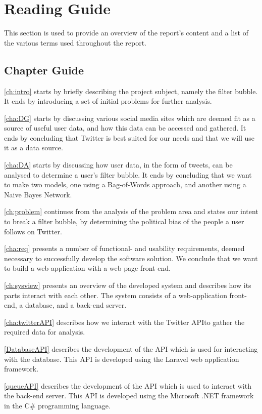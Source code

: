 \section{Reading Guide}\label{sec:readingGuide}
This section is used to provide an overview of the report's content and a list
of the various terms used throughout the report.

\subsection{Chapter Guide}
\autoref{ch:intro} starts by briefly describing the project subject, namely  the
filter bubble. It ends by introducing a set of initial problems for further
analysis.\nl

\autoref{cha:DG} starts by discussing various social media sites which are
deemed fit as a source of useful user data, and how this data can be
accessed and gathered. It ends by concluding that Twitter is best suited for our
needs and that we will use it as a data source.\nl

\autoref{cha:DA} starts by discussing how user data, in the form of tweets, can
be analysed to determine a user's filter bubble. It ends by concluding
that we want to make two models, one using a Bag-of-Words approach, and another
using a Naive Bayes Network.\nl

\autoref{ch:problem} continues from the analysis of the problem area and states
our intent to break a filter bubble, by determining the political bias of the
people a user follows on Twitter.\nl

\autoref{cha:req} presents a number of functional- and usability requirements,
deemed necessary to successfully develop the software solution. We conclude that
we want to build a web-application with a web page front-end.\nl

\autoref{ch:sysview} presents an overview of the developed system and describes
how its parts interact with each other. The system consists of a web-application
front-end, a database, and a back-end server.\nl

\autoref{cha:twitterAPI} describes how we interact with the Twitter \ac{API}to
gather the required data for analysis.\nl

\autoref{DatabaseAPI} describes the development of the \ac{API} which is used
for interacting with the database. This \ac{API} is developed using the Laravel
web application framework.\nl

\autoref{queueAPI} describes the development of the \ac{API} which is used to
interact with the back-end server. This \ac{API} is developed using the
Microsoft .NET framework in the C\# programming language.\nl

